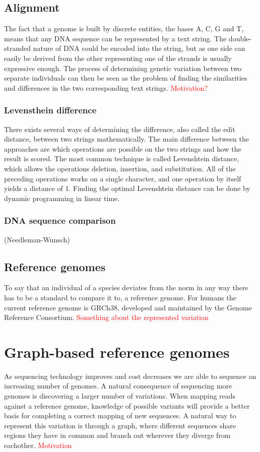 \documentclass[thesis.tex]{subfiles}
\begin{document}
\subsection{Alignment}
The fact that a genome is built by discrete entities, the bases A, C, G and T, means that any DNA sequence can be represented by a text string. The double-stranded nature of DNA could be encoded into the string, but as one side can easily be derived from the other representing one of the strands is usually expressive enough. The process of determining genetic variation between two separate individuals can then be seen as the problem of finding the similarities and differences in the two corresponding text strings. \textcolor{red}{Motivation?}
\subsubsection{Levensthein difference}
There exists several ways of determining the difference, also called the edit distance, between two strings mathematically. The main difference between the approaches are which operations are possible on the two strings and how the result is scored. The most common technique is called Levenshtein distance, which allows the operations deletion, insertion, and substitution. All of the preceding operations works on a single character, and one operation by itself yields a distance of 1. Finding the optimal Levenshtein distance can be done by dynamic programming in linear time.
\subsubsection{DNA sequence comparison}
(Needleman-Wunsch)

\subsection{Reference genomes}
To say that an individual of a species deviates from the norm in any way there has to be a standard to compare it to, a reference genome. For humans the current reference genome is GRCh38, developed and maintained by the Genome Reference Consortium. \textcolor{red}{Something about the represented variation}
\section{Graph-based reference genomes}
As sequencing technology improves and cost decreases we are able to sequence an increasing number of genomes. A natural consequence of sequencing more genomes is discovering a larger number of variations. When mapping reads against a reference genome, knowledge of possible variants will provide a better basis for completing a correct mapping of new sequences\cite{improved_genome_inference_in_the_mhc_using_a_population_reference_graph}. A natural way to represent this variation is through a graph, where different sequences share regions they have in common and branch out wherever they diverge from eachother. \textcolor{red}{Motivation}
\end{document}
